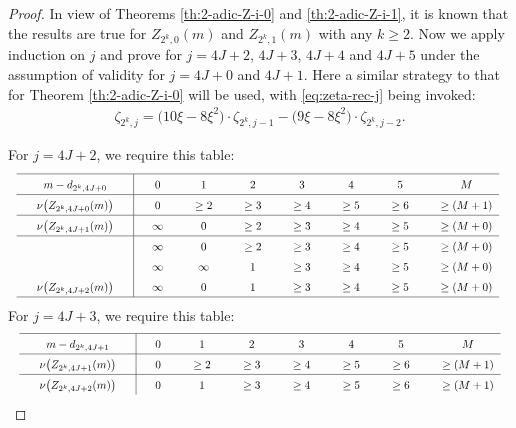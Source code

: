 \documentclass[12pt,reqno]{amsart}
\numberwithin{equation}{section}
\theoremstyle{theorem}
\theoremstyle{definition}
\begin{document}
\begin{proof}
	In view of Theorems \ref{th:2-adic-Z-i-0} and \ref{th:2-adic-Z-i-1}, it is known that the results are true for $Z_{2^k,0}(m)$ and $Z_{2^k,1}(m)$ with any $k\ge 2$. Now we apply induction on $j$ and prove for $j=4J+2$, $4J+3$, $4J+4$ and $4J+5$ under the assumption of validity for $j=4J+0$ and $4J+1$. Here a similar strategy to that for Theorem \ref{th:2-adic-Z-i-0} will be used, with \eqref{eq:zeta-rec-j} being invoked:
	\begin{align*}
		\zeta_{2^k,j} = \big(10 \xi - 8 \xi^2\big)\cdot \zeta_{2^k,j-1} - \big(9 \xi - 8 \xi^2\big)\cdot \zeta_{2^k,j-2}.
	\end{align*}
	
	For $j=4J+2$, we require this table:
	\begin{align*}
		\renewcommand\arraystretch{1.5}
		\scalebox{0.8}{%
			\begin{tabular*}{1.25\textwidth}{p{0pt}cp{0pt}|@{\extracolsep{\fill}}ccccccc}
				\hline
				& $m-d_{2^k,4J+0}$ && $0$ & $1$ & $2$ & $3$ & $4$ & $5$ & $M$\\
				\hline
				& $\nu\big(Z_{2^k,4J+0}(m)\big)$ && $0$ & $\ge 2$ & $\ge 3$ & $\ge 4$ & $\ge 5$ & $\ge 6$ & $\ge (M+1)$\\
				\hline
				& $\nu\big(Z_{2^k,4J+1}(m)\big)$ && $\infty$ & $0$ & $\ge 2$ & $\ge 3$ & $\ge 4$ & $\ge 5$ & $\ge (M+0)$\\
				\hline
				&  && $\infty$ & $0$ & $\ge 2$ & $\ge 3$ & $\ge 4$ & $\ge 5$ & $\ge (M+0)$\\
				&  && $\infty$ & $\infty$ & $1$ & $\ge 3$ & $\ge 4$ & $\ge 5$ & $\ge (M+0)$\\
				& $\nu\big(Z_{2^k,4J+2}(m)\big)$ && $\infty$ & $0$ & $1$ & $\ge 3$ & $\ge 4$ & $\ge 5$ & $\ge (M+0)$\\
				\hline
			\end{tabular*}
		}
	\end{align*}
	For $j=4J+3$, we require this table:
	\begin{align*}
		\renewcommand\arraystretch{1.5}
		\scalebox{0.8}{%
			\begin{tabular*}{1.25\textwidth}{p{0pt}cp{0pt}|@{\extracolsep{\fill}}ccccccc}
				\hline
				& $m-d_{2^k,4J+1}$ && $0$ & $1$ & $2$ & $3$ & $4$ & $5$ & $M$\\
				\hline
				& $\nu\big(Z_{2^k,4J+1}(m)\big)$ && $0$ & $\ge 2$ & $\ge 3$ & $\ge 4$ & $\ge 5$ & $\ge 6$ & $\ge (M+1)$\\
				\hline
				& $\nu\big(Z_{2^k,4J+2}(m)\big)$ && $0$ & $1$ & $\ge 3$ & $\ge 4$ & $\ge 5$ & $\ge 6$ & $\ge (M+1)$\\

\end{tabular*}}
\end{align*}
\end{proof}
\end{document}
